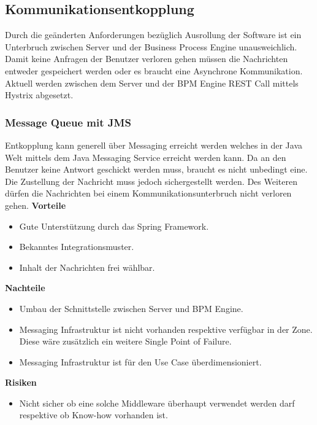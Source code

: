 \subsection{Kommunikationsentkopplung}

Durch die geänderten Anforderungen bezüglich Ausrollung der Software ist ein Unterbruch zwischen Server und der Business Process Engine unausweichlich. Damit keine Anfragen der Benutzer verloren gehen müssen die Nachrichten entweder gespeichert werden oder es braucht eine Asynchrone Kommunikation. Aktuell werden zwischen dem Server und der \Gls{BPM} Engine \gls{REST} Call mittels Hystrix abgesetzt.

\subsubsection{Message Queue mit JMS}

Entkopplung kann generell über Messaging erreicht werden welches in der Java Welt mittels dem Java Messaging Service erreicht werden kann. Da an den Benutzer keine Antwort geschickt werden muss, braucht es nicht unbedingt eine. Die Zustellung der Nachricht muss jedoch sichergestellt werden. Des Weiteren dürfen die Nachrichten bei einem Kommunikationsunterbruch nicht verloren gehen.
\newline
\newline
\textbf{Vorteile}
\begin{itemize}
	\item Gute Unterstützung durch das Spring Framework.
	\item Bekanntes Integrationsmuster.
	\item Inhalt der Nachrichten frei wählbar.
\end{itemize}
\textbf{Nachteile}
\begin{itemize}
	\item Umbau der Schnittstelle zwischen Server und BPM Engine.
	\item Messaging Infrastruktur ist nicht vorhanden respektive verfügbar in der Zone. Diese wäre zusätzlich ein weitere Single Point of Failure.
	\item Messaging Infrastruktur ist für den Use Case überdimensioniert.
\end{itemize}
\textbf{Risiken}
\begin{itemize}
	\item Nicht sicher ob eine solche Middleware überhaupt verwendet werden darf respektive ob Know-how vorhanden ist.
\end{itemize}

